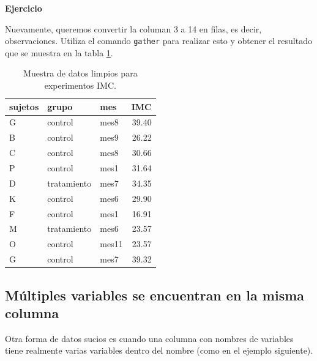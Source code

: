 \documentclass[]{article}
\begin{document}
\textbf{Ejercicio}

Nuevamente, queremos convertir la columan 3 a 14 en filas, es decir,
observaciones. Utiliza el comando \texttt{gather} para realizar esto y
obtener el resultado que se muestra en la tabla \ref{tab:sujetostidy}.

\begin{table}[ht]
\centering
\begin{tabular}{lllr}
  \hline
sujetos & grupo & mes & IMC \\ 
  \hline
G & control & mes8 & 39.40 \\ 
  B & control & mes9 & 26.22 \\ 
  C & control & mes8 & 30.66 \\ 
  P & control & mes1 & 31.64 \\ 
  D & tratamiento & mes7 & 34.35 \\ 
  K & control & mes6 & 29.90 \\ 
  F & control & mes1 & 16.91 \\ 
  M & tratamiento & mes6 & 23.57 \\ 
  O & control & mes11 & 23.57 \\ 
  G & control & mes7 & 39.32 \\ 
   \hline
\end{tabular}
\caption{Muestra de datos limpios para experimentos IMC.} 
\label{tab:sujetostidy}
\end{table}

\subsection{Múltiples variables se encuentran en la misma
columna}\label{multiples-variables-se-encuentran-en-la-misma-columna}

Otra forma de datos sucios es cuando una columna con nombres de
variables tiene realmente varias variables dentro del nombre (como en el
ejemplo siguiente).
\end{document}
